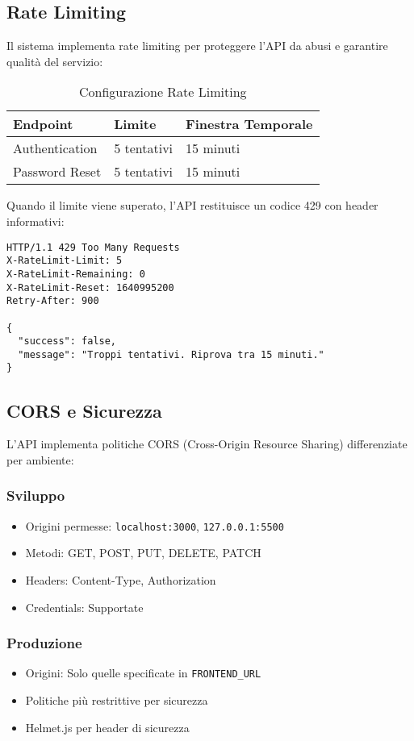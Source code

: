 \subsection{Rate Limiting}
Il sistema implementa rate limiting per proteggere l'API da abusi e garantire qualità del servizio:

\begin{table}[H]
\centering
\begin{tabular}{@{}lll@{}}
\toprule
\textbf{Endpoint} & \textbf{Limite} & \textbf{Finestra Temporale} \\
\midrule
Authentication & 5 tentativi & 15 minuti \\
Password Reset & 5 tentativi & 15 minuti \\
\bottomrule
\end{tabular}
\caption{Configurazione Rate Limiting}
\end{table}

Quando il limite viene superato, l'API restituisce un codice 429 con header informativi:
\begin{lstlisting}[style=httpstyle, caption=Response Headers Rate Limiting]
HTTP/1.1 429 Too Many Requests
X-RateLimit-Limit: 5
X-RateLimit-Remaining: 0
X-RateLimit-Reset: 1640995200
Retry-After: 900

{
  "success": false,
  "message": "Troppi tentativi. Riprova tra 15 minuti."
}
\end{lstlisting}

\subsection{CORS e Sicurezza}
L'API implementa politiche CORS (Cross-Origin Resource Sharing) differenziate per ambiente:

\subsubsection{Sviluppo}
\begin{itemize}
    \item Origini permesse: \texttt{localhost:3000}, \texttt{127.0.0.1:5500}
    \item Metodi: GET, POST, PUT, DELETE, PATCH
    \item Headers: Content-Type, Authorization
    \item Credentials: Supportate
\end{itemize}

\subsubsection{Produzione}
\begin{itemize}
    \item Origini: Solo quelle specificate in \texttt{FRONTEND\_URL}
    \item Politiche più restrittive per sicurezza
    \item Helmet.js per header di sicurezza
\end{itemize}

